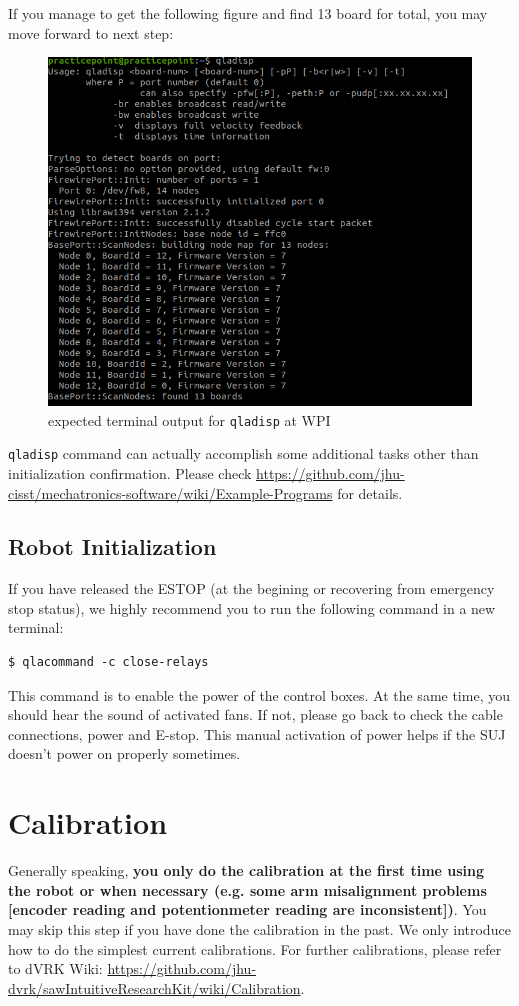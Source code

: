 If you manage to get the following figure and find 13 board for total, you may move forward to next step:

\begin{figure}[H]
    \centering
    \includegraphics[width=0.5\linewidth]{figures/qladisp.png}
    \caption{expected terminal output for \texttt{qladisp} at WPI}
    \label{fig:qladisp}
\end{figure}

\texttt{qladisp} command can actually accomplish some additional tasks other than initialization confirmation. Please check \url{https://github.com/jhu-cisst/mechatronics-software/wiki/Example-Programs} for details.

\subsection{Robot Initialization}

If you have released the ESTOP (at the begining or recovering from emergency stop status), we highly recommend you to run the following command in a new terminal:

\begin{verbatim}
$ qlacommand -c close-relays
\end{verbatim}

This command is to enable the power of the control boxes. At the same time, you should hear the sound of activated fans. If not, please go back to check the cable connections, power and E-stop. This manual activation of power helps if the SUJ doesn't power on properly sometimes.

\section{Calibration}

Generally speaking, \textbf{you only do the calibration at the first time using the robot or when necessary (e.g. some arm misalignment problems [encoder reading and potentionmeter reading are inconsistent])}. You may skip this step if you have done the calibration in the past. We only introduce how to do the simplest current calibrations. For further calibrations, please refer to dVRK Wiki: \url{https://github.com/jhu-dvrk/sawIntuitiveResearchKit/wiki/Calibration}.

